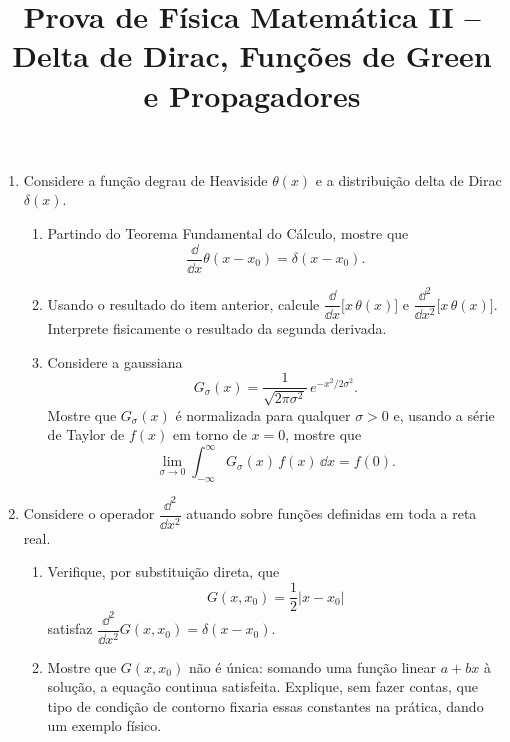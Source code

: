 \newif\ifuseseminar
\useseminartrue


\title{Prova de Física Matemática II -- Delta de Dirac, Funções de Green e Propagadores}



\begin{enumerate}

	\item Considere a função degrau de Heaviside $\theta(x)$ e a distribuição
	      delta de Dirac $\delta(x)$.
	      \begin{enumerate}
		      \item Partindo do Teorema Fundamental do Cálculo, mostre que
		            $$
			            \frac{\dd}{\dd x}\theta(x-x_0) = \delta(x-x_0).
		            $$
		      \item Usando o resultado do item anterior, calcule
		            $\dfrac{\dd}{\dd x}\big[x\,\theta(x)\big]$ e
		            $\dfrac{\dd^2}{\dd x^2}\big[x\,\theta(x)\big]$. Interprete
		            fisicamente o resultado da segunda derivada.
		      \item Considere a gaussiana
		            $$
			            G_\sigma(x) = \frac{1}{\sqrt{2\pi\sigma^2}}\, e^{-x^2/2\sigma^2}.
		            $$
		            Mostre que $G_\sigma(x)$ é normalizada para qualquer $\sigma>0$
		            e, usando a série de Taylor de $f(x)$ em torno de $x=0$, mostre
		            que
		            $$
			            \lim_{\sigma\to0}\int_{-\infty}^{\infty} G_\sigma(x)\, f(x)\,\dd x = f(0).
		            $$
	      \end{enumerate}

	\item Considere o operador $\dfrac{\dd^2}{\dd x^2}$ atuando sobre funções
	      definidas em toda a reta real.
	      \begin{enumerate}
		      \item Verifique, por substituição direta, que
		            $$
			            G(x,x_0) = \frac{1}{2}|x-x_0|
		            $$
		            satisfaz $\dfrac{\dd^2}{\dd x^2}G(x,x_0) = \delta(x-x_0)$.
		      \item Mostre que $G(x,x_0)$ não é única: somando uma função linear
		            $a+bx$ à solução, a equação continua satisfeita. Explique,
		            sem fazer contas, que tipo de condição de contorno fixaria
		            essas constantes na prática, dando um exemplo físico.
	      \end{enumerate}


\end{enumerate}
